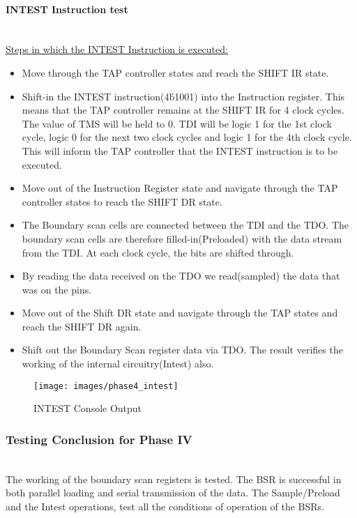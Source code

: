\documentclass[a4paper,11pt]{article}
\begin{document}
\paragraph{INTEST Instruction test}\mbox{}\\
\underline{Steps in which the INTEST Instruction is executed:}
\begin{itemize}[noitemsep]
\item Move through the TAP controller states and reach the SHIFT IR state.
\item Shift-in the INTEST instruction(4\'b1001) into the Instruction register. This means that the TAP controller remains at the SHIFT IR for 4 clock cycles. The value of TMS will be held to 0. TDI will be logic 1 for the 1st clock cycle, logic 0 for the next two clock cycles and logic 1 for the 4th clock cycle. This will inform the TAP controller that the INTEST instruction is to be executed.
\item Move out of the Instruction Register state and navigate through the TAP controller states to reach the SHIFT DR state.
\item The Boundary scan cells are connected between the TDI and the TDO. The boundary scan cells are therefore filled-in(Preloaded) with the data stream from the TDI. At each clock cycle, the bits are shifted through. 
\item By reading the data received on the TDO we read(sampled) the data that was on the pins.
\item Move out of the Shift DR state and navigate through the TAP states and reach the SHIFT DR again.
\item Shift out the Boundary Scan register data via TDO. The result verifies the working of the internal circuitry(Intest) also.
\end{itemize}
\begin{figure}[ht]
\centering
\texttt{[image: images/phase4\_intest]}
\caption{INTEST Console Output}
\end{figure}
\FloatBarrier
\subsubsection{Testing Conclusion for Phase IV}
\ \\
The working of the boundary scan registers is tested. The BSR is successful in both parallel loading and serial transmission of the data. The Sample/Preload and the Intest operations, test all the conditions of operation of the BSRs.
\end{document}
